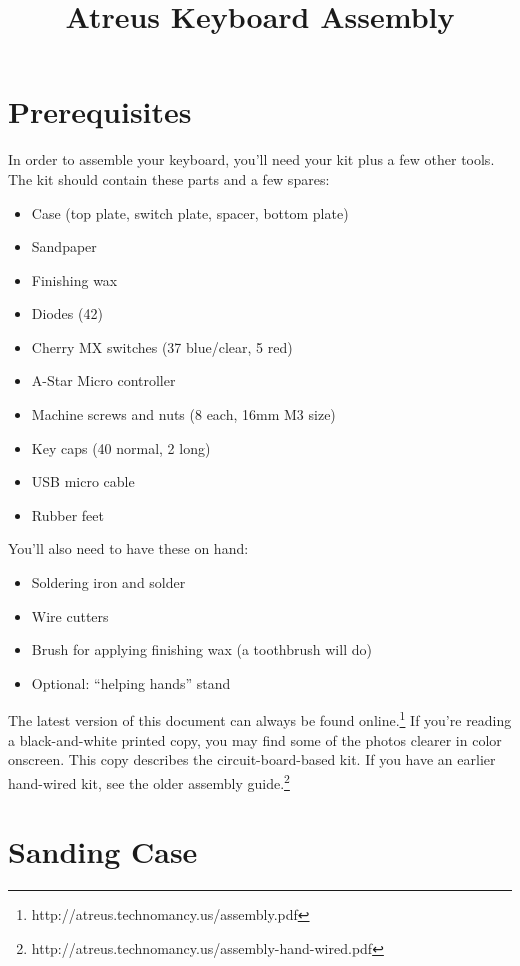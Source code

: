 \documentclass{article}
\title{Atreus Keyboard Assembly}
\date{ }
\begin{document}
\setlength{\parindent}{0cm}
\maketitle
\section{Prerequisites}

In order to assemble your keyboard, you'll need your kit plus a few
other tools. The kit should contain these parts and a few spares:

\begin{itemize}
\item Case (top plate, switch plate, spacer, bottom plate)
\item Sandpaper
\item Finishing wax
\item Diodes (42)
\item Cherry MX switches (37 blue/clear, 5 red)
\item A-Star Micro controller
\item Machine screws and nuts (8 each, 16mm M3 size)
\item Key caps (40 normal, 2 long)
\item USB micro cable
\item Rubber feet
\end{itemize}

You'll also need to have these on hand:

\begin{itemize}
\item Soldering iron and solder
\item Wire cutters
\item Brush for applying finishing wax (a toothbrush will do)
\item Optional: ``helping hands'' stand
\end{itemize}

\vspace{1em}

The latest version of this document can always be found
online.\footnote{http://atreus.technomancy.us/assembly.pdf} If you're
reading a black-and-white printed copy, you may find some of the
photos clearer in color onscreen. This copy describes
the circuit-board-based kit. If you have an earlier hand-wired kit,
see the older assembly
guide.\footnote{http://atreus.technomancy.us/assembly-hand-wired.pdf}

\section{Sanding Case}
\end{document}
